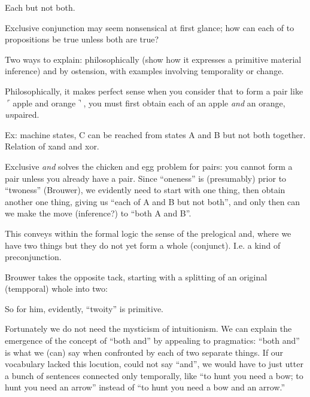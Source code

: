 \documentclass{article}
\begin{document}
Each but not both.

Exclusive conjunction may seem nonsensical at first glance; how can
each of to propositions be true unless both are true?

Two ways to explain: philosophically (show how it expresses a primitive
material inference) and by ostension, with examples involving
temporality or change.

Philosophically, it makes perfect sense when you consider that to form
a pair like \(\ulcorner\)apple and orange\(\urcorner\), you must first
obtain each of an apple \textit{and} an orange, \textit{un}paired.

Ex: machine states, C can be reached from states A and B but not both
together.  Relation of xand and xor.

Exclusive \textit{and} solves the chicken and egg problem for pairs:
you cannot form a pair unless you already have a pair. Since
``oneness'' is (presumably) prior to ``twoness'' (Brouwer), we
evidently need to start with one thing, then obtain another one thing,
giving us ``each of A and B but not both'', and only then can we make
the move (inference?) to ``both A and B''.

This conveys within the formal logic the sense of the prelogical and,
where we have two things but they do not yet form a whole (conjunct).
I.e. a kind of preconjunction.

Brouwer takes the opposite tack, starting with a splitting of an
original (tempporal) whole into two:


So for him, evidently, ``twoity'' is primitive.

Fortunately we do not need the mysticism of intuitionism. We can
explain the emergence of the concept of ``both and'' by appealing to
pragmatics: ``both and'' is what we (can) say when confronted by each
of two separate things. If our vocabulary lacked this locution, could
not say ``and'', we would have to just utter a bunch of sentences
connected only temporally, like ``to hunt you need a bow; to hunt you
need an arrow'' instead of ``to hunt you need a bow and an arrow.''
\end{document}
